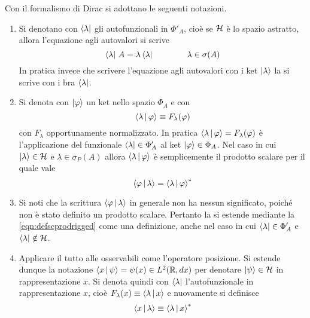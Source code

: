 \documentclass[../../FisicaTeorica.tex]{subfiles}
\begin{document}
Con il formalismo di Dirac si adottano le seguenti notazioni.
\begin{enumerate}
\item Si denotano con $\Bra\lambda$ gli autofunzionali in $\Phi'_A$, cioè se $\mathcal{H}$ è lo spazio astratto, allora l'equazione agli autovalori si scrive
\[
\Bra\lambda \, A = \lambda \Bra\lambda \qquad \qquad \lambda \in \sigma(A)
\]
In pratica invece che scrivere l'equazione agli autovalori con i ket $\Ket\lambda$ la si scrive con i bra $\Bra\lambda$.
\item Si denota con $\Ket\varphi$ un ket nello spazio $\Phi_A$ e con
\[
\Braket{\lambda | \varphi} \equiv F_\lambda (\varphi)
\]
con $F_\lambda$ opportunamente normalizzato. In pratica $\Braket{\lambda | \varphi} = F_\lambda(\varphi)$ è l'applicazione del funzionale $\Bra\lambda \in \Phi_A'$ al ket $\Ket\varphi \in \Phi_A$.
Nel caso in cui $\Ket\lambda \in \mathcal{H}$ e $\lambda \in \sigma_P(A)$ allora $\Braket{\lambda|\varphi}$ è semplicemente il prodotto scalare per il quale vale
\begin{equation}
\label{eqn:defscprodrigged}
\Braket{\varphi | \lambda} = \Braket{\lambda | \varphi}^*
\end{equation}
\item Si noti che la scrittura $\Braket{\varphi | \lambda}$ in generale non ha nessun significato, poiché non è stato definito un prodotto scalare. Pertanto la si estende mediante la \eqref{eqn:defscprodrigged} come una definizione, anche nel caso in cui $\Bra\lambda \in \Phi'_A$ e $\Bra\lambda \notin \mathcal{H}$.
\item Applicare il tutto alle osservabili come l'operatore posizione. Si estende dunque la notazione $\Braket{x | \psi} = \psi(x) \in L^2(\mathbb R, d x)$ per denotare $\Ket\psi \in \mathcal{H}$ in rappresentazione $x$. Si denota quindi con $\Bra{\lambda}$ l'autofunzionale in rappresentazione $x$, cioè $F_\lambda(x) \equiv \Braket{\lambda | x}$ e nuovamente si definisce 
\[
\Braket{x | \lambda} \equiv \Braket{\lambda | x}^*
\]
\end{enumerate}
\end{document}
